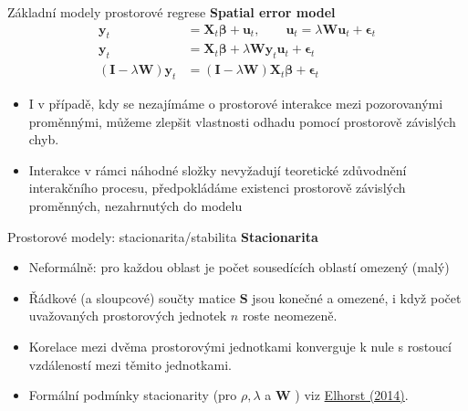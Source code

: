 \documentclass{beamer}
\begin{document}
\begin{frame}{Základní modely prostorové regrese}
\textbf{Spatial error model}
	\begin{align*}
	\bm{y}_t & =   \bm{X}_t\bm{\beta}+  \bm{u}_t, \qquad \bm{u}_t = \lambda  \bm{Wu}_t + \bm{\epsilon}_t\\
	\bm{y}_t & = \bm{X}_t\bm{\beta}+ \lambda\bm{Wy}_t\bm{u}_t+  \bm{\epsilon}_t\\
	(\bm{I} - \lambda \bm{W}) \bm{y}_t & = (\bm{I} - \lambda \bm{W}) \bm{X}_t \bm{\beta} + \bm{\epsilon}_t
	\end{align*}
\begin{itemize}

	\item I v případě, kdy se nezajímáme o prostorové interakce mezi pozorovanými proměnnými, můžeme zlepšit vlastnosti odhadu pomocí prostorově závislých chyb.
	\item Interakce v rámci náhodné složky nevyžadují teoretické zdůvodnění interakčního procesu, předpokládáme existenci prostorově závislých proměnných, nezahrnutých do modelu
\end{itemize}
\end{frame}
\begin{frame}{Prostorové modely:  stacionarita/stabilita}
\textbf{Stacionarita}
\begin{itemize}
\item Neformálně: pro každou oblast je počet sousedících oblastí omezený (malý)
\item Řádkové (a sloupcové) součty matice $\bm{S}$ jsou konečné a omezené, i když počet uvažovaných prostorových jednotek $n$ roste neomezeně.
\item Korelace mezi dvěma prostorovými jednotkami konverguje k nule s rostoucí vzdáleností mezi těmito jednotkami.
\item Formální podmínky stacionarity (pro $\rho, \lambda$ a $\bm{W}$ ) viz \href{https://www.google.cz/url?sa=t&rct=j&q=&esrc=s&source=web&cd=1&cad=rja&uact=8&ved=0ahUKEwjjwvLCk8bLAhXEvXIKHWSHBxsQFgggMAA&url=http://www.springer.com/cda/content/document/cda_downloaddocument/9783642403392-c2.pdf?SGWID\%3D0-0-45-1432965-p175381976&usg=AFQjCNGpme8ofJQzd46BCJVsUEio6oKIzQ&sig2=LlarV9wYhELGcTPiqzfRgg}{Elhorst (2014)}.
\end{itemize}
\end{frame}
\end{document}
